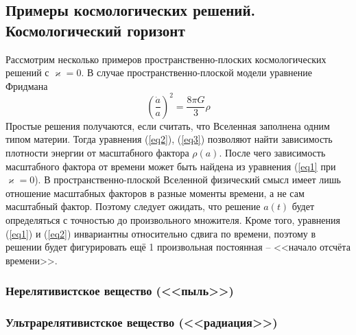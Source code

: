 \documentclass[12pt]{article}
\theoremstyle{definition}
\begin{document}
\subsection{Примеры космологических решений. Космологический горизонт}
Рассмотрим несколько примеров пространственно-плоских космологических решений с $\varkappa=0$. В случае пространственно-плоской модели уравнение Фридмана
\begin{equation}
    \left(\frac{\dot{a}}{a}\right)^2=\frac{8\pi G}{3}\rho
\end{equation}
Простые решения получаются, если считать, что Вселенная заполнена одним типом материи. Тогда уравнения (\ref{eq2}), (\ref{eq3}) позволяют найти зависимость плотности энергии от масштабного фактора $\rho(a)$. После чего зависимость масштабного фактора от времени может быть найдена из уравнения (\ref{eq1} при $\varkappa=0$). В пространственно-плоской Вселенной физический смысл имеет лишь отношение масштабных факторов в разные моменты времени, а не сам масштабный фактор. Поэтому следует ожидать, что решение $a(t)$ будет определяться с точностью до произвольного множителя. Кроме того, уравнения (\ref{eq1}) и (\ref{eq2}) инвариантны относительно сдвига по времени, поэтому в решении будет фигурировать ещё 1 произвольная постоянная -- <<начало отсчёта времени>>.
\subsubsection{Нерелятивистское вещество (<<пыль>>)}
\subsubsection{Ультрарелятивистское вещество (<<радиация>>)}
\newpage
\end{document}
